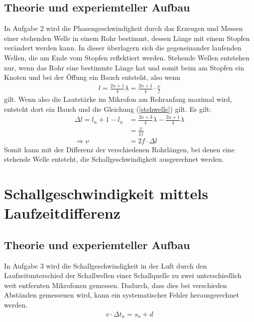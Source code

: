 \documentclass[11pt, a4paper]{article}
\begin{document}
    \subsection{Theorie und experiemteller Aufbau}
    In Aufgabe 2 wird die Phasengeschwindigkeit durch das Erzeugen und Messen 
    einer stehenden Welle in einem Rohr bestimmt, dessen Länge mit einem Stopfen verändert werden kann.
    In dieser überlagern sich die gegeneinander laufenden Wellen,
    die  am Ende vom Stopfen reflektiert werden. Stehende Wellen entstehen nur, wenn das Rohr eine bestimmte Länge hat
    und somit beim am Stopfen ein Knoten und bei der Öffung ein Bauch entsteht, also wenn
    \begin{align} \label{stehwelle}
        l = \frac{2n+1}{4} \lambda = \frac{2n + 1}{4} \cdot \frac{\nu}{f}
    \end{align}
    gilt. Wenn also die Lautstärke im Mikrofon am Rohranfang maximal wird, entsteht dort ein Bauch und die Gleichung
    (\ref{stehwelle}) gilt. Es gilt: 
    \begin{align}
        \Delta l = l_n+1 - l_n &= \frac{2n+3}{4} \lambda - \frac{2n+1}{4} \lambda \nonumber \\
        &= \frac{\nu}{2f} \nonumber \\
         \Rightarrow \nu &= 2f \cdot \Delta l
    \end{align}
    Somit kann mit der Differenz der verschiedenen Rohrlängen, bei denen eine stehende Welle 
    entsteht, die Schallgeschwindigkeit ausgerechnet werden.

    \section{Schallgeschwindigkeit mittels Laufzeitdifferenz}

    \subsection{Theorie und experiemteller Aufbau}
    In Aufgabe 3 wird die Schallgeschwindigkeit in der Luft durch den Laufzeitunterschied der Schallwellen einer Schallquelle zu zwei unterschiedlich
    weit entfernten Mikrofonen gemessen. Dadurch, dass dies bei verschieden Abständen gemessenen wird, kann ein systematischer
    Fehler herausgerechnet werden.
    \begin{align}
        v \cdot \Delta t_n = s_n + d
    \end{align}
\end{document}
